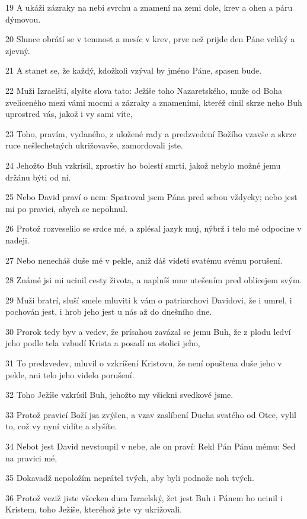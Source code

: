 \par 19 A ukáži zázraky na nebi svrchu a znamení na zemi dole, krev a ohen a páru dýmovou.
\par 20 Slunce obrátí se v temnost a mesíc v krev, prve než prijde den Páne veliký a zjevný.
\par 21 A stanet se, že každý, kdožkoli vzýval by jméno Páne, spasen bude.
\par 22 Muži Izraelští, slyšte slova tato: Ježíše toho Nazaretského, muže od Boha zveliceného mezi vámi mocmi a zázraky a znameními, kteréž cinil skrze neho Buh uprostred vás, jakož i vy sami víte,
\par 23 Toho, pravím, vydaného, z uložené rady a predzvedení Božího vzavše a skrze ruce nešlechetných ukrižovavše, zamordovali jste.
\par 24 Jehožto Buh vzkrísil, zprostiv ho bolestí smrti, jakož nebylo možné jemu držánu býti od ní.
\par 25 Nebo David praví o nem: Spatroval jsem Pána pred sebou vždycky; nebo jest mi po pravici, abych se nepohnul.
\par 26 Protož rozveselilo se srdce mé, a zplésal jazyk muj, nýbrž i telo mé odpocine v nadeji.
\par 27 Nebo nenecháš duše mé v pekle, aniž dáš videti svatému svému porušení.
\par 28 Známé jsi mi ucinil cesty života, a naplníš mne utešením pred oblicejem svým.
\par 29 Muži bratrí, sluší smele mluviti k vám o patriarchovi Davidovi, že i umrel, i pochován jest, i hrob jeho jest u nás až do dnešního dne.
\par 30 Prorok tedy byv a vedev, že prísahou zavázal se jemu Buh, že z plodu ledví jeho podle tela vzbudí Krista a posadí na stolici jeho,
\par 31 To predzvedev, mluvil o vzkríšení Kristovu, že není opuštena duše jeho v pekle, ani telo jeho videlo porušení.
\par 32 Toho Ježíše vzkrísil Buh, jehožto my všickni svedkové jsme.
\par 33 Protož pravicí Boží jsa zvýšen, a vzav zaslíbení Ducha svatého od Otce, vylil to, což vy nyní vidíte a slyšíte.
\par 34 Nebot jest David nevstoupil v nebe, ale on praví: Rekl Pán Pánu mému: Sed na pravici mé,
\par 35 Dokavadž nepoložím neprátel tvých, aby byli podnože noh tvých.
\par 36 Protož veziž jiste všecken dum Izraelský, žet jest Buh i Pánem ho ucinil i Kristem, toho Ježíše, kteréhož jste vy ukrižovali.
